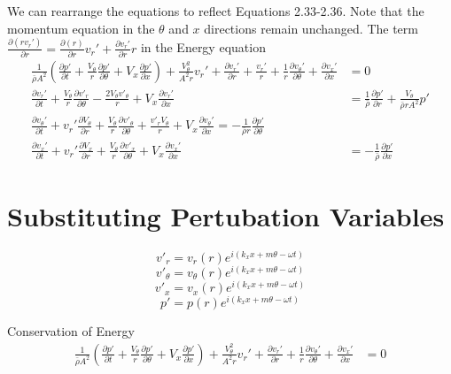 \documentclass[12pt]{article}
\begin{document}
We can rearrange the equations to reflect Equations 2.33-2.36. Note that the momentum equation in the $\theta$ and $x$ directions remain unchanged. The term $ \frac{\partial(rv_r')}{\partial r}  = \frac{\partial (r)}{\partial r}v_r' + \frac{\partial v_r'}{\partial r} r$ in the Energy equation
\begin{align*}
\frac{1}{\bar{\rho} A^2}\left(
\frac{\partial p'}{\partial t} +
\frac{V_{\theta}}{r}
\frac{\partial p'}{\partial \theta} + 
V_x
\frac{\partial p'}{\partial x}
\right) +
\frac{V_{\theta}^2}{A^2 r}v_r'+
\frac{\partial v_r'}{\partial r} + \frac{v_r'}{r} +
\frac{1}{r}
\frac{\partial v_{\theta}'}{\partial \theta}		 
 +
\frac{\partial v_x'}{\partial x}
&= 0\\
\frac{\partial  v_r' }{\partial t} +
\frac{V_{\theta}}{r} \frac{\partial v'_r}{\partial \theta} -
\frac{2V_{\theta}v'_{\theta}}{r} +
V_x \frac{\partial v_r'}{\partial x} &= \frac{1}{\bar{\rho}} \frac{\partial p'}{\partial r}+\frac{V_{\theta}}{\bar{\rho} r A^2}   p'
\\
\frac{\partial  v_{\theta}' }{\partial t} +
v_r' \frac{\partial  V_{\theta}  }{\partial r} +
\frac{V_{\theta}}{r} \frac{\partial v'_{\theta}}{\partial \theta} +
\frac{v'_rV_{\theta}}{r} +
V_x \frac{\partial v_{\theta}'}{\partial x} 
= -\frac{1}{\bar{\rho} r}	\frac{\partial p'}{\partial \theta}\\
\frac{\partial  v_x' }{\partial t} +
v_r' \frac{\partial  V_x  }{\partial r} +
\frac{V_{\theta}}{r} \frac{\partial v'_x}{\partial \theta} +
V_x \frac{\partial v_x'}{\partial x} 
&= -\frac{1    }{\bar{\rho}}  \frac{\partial p'}{\partial x} 	
\end{align*}

\newpage
\section{Substituting Pertubation Variables}
\[v'_r = v_r (r) e^{i\left(k_x x + m \theta - \omega t \right)} \]
\[v'_{\theta} = v_{\theta} (r) e^{i\left(k_x x + m \theta - \omega t \right)} \]	
\[v'_x = v_x (r) e^{i\left(k_x x + m \theta - \omega t\right)} \]	
\[p' = p(r) e^{i\left(k_x x + m \theta - \omega t\right)} \]	

Conservation of Energy
\begin{align*}
\frac{1}{\bar{\rho} A^2}\left(
\frac{\partial p'}{\partial t} +
\frac{V_{\theta}}{r}
\frac{\partial p'}{\partial \theta} + 
V_x
\frac{\partial p'}{\partial x}
\right) +
\frac{V_{\theta}^2}{A^2 r}v_r'+
\frac{\partial v_r'}{\partial r} + 
\frac{1}{r}
\frac{\partial v_{\theta}'}{\partial \theta}		 
+
\frac{\partial v_x'}{\partial x}
&= 0
\end{align*}
\end{document}
